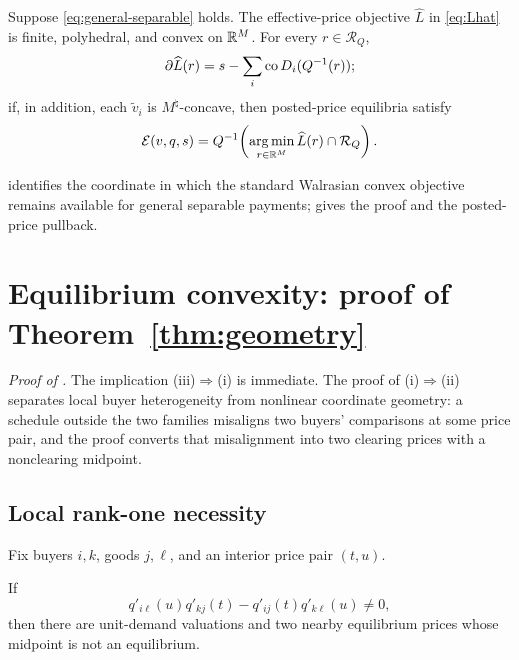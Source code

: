 \begin{proposition}\label{prop:effective}
Suppose \eqref{eq:general-separable} holds. The effective-price objective $\widehat L$ in \eqref{eq:Lhat} is finite, polyhedral, and convex on $\mathbb{R}^M$. For every $r\in\mathcal R_Q$,
\begin{equation}\label{eq:Lhat-subdiff}
\partial\widehat L(r)
=s-\sum_i\operatorname{co} D_i(Q^{-1}(r));
\end{equation}
if, in addition, each $\widetilde v_i$ is $M^\natural$-concave, then posted-price equilibria satisfy
\begin{equation}\label{eq:effective-minimizers}
\mathcal{E}(v,q,s)=Q^{-1}\!\left(\operatorname*{arg\,min}_{r\in\mathbb{R}^M}\widehat L(r)\cap\mathcal R_Q\right).
\end{equation}
\end{proposition}

 identifies the coordinate in which the standard Walrasian convex objective remains available for general separable payments;  gives the proof and the posted-price pullback.

\section{Equilibrium convexity: proof of Theorem~\ref{thm:geometry}}\label{sec:geometry}

\noindent\textit{Proof of .} The implication (iii)$\Rightarrow$(i) is immediate. The proof of (i)$\Rightarrow$(ii) separates local buyer heterogeneity from nonlinear coordinate geometry: a schedule outside the two families misaligns two buyers' comparisons at some price pair, and the proof converts that misalignment into two clearing prices with a nonclearing midpoint.

\subsection{Local rank-one necessity}

Fix buyers $i,k$, goods $j,\ell$, and an interior price pair $(t,u)$.

\begin{proposition}\label{prop:local-minor}
If
\[
q'_{i\ell}(u)q'_{kj}(t)-q'_{ij}(t)q'_{k\ell}(u)\ne0,
\]
then there are unit-demand valuations and two nearby equilibrium prices whose midpoint is not an equilibrium.
\end{proposition}

